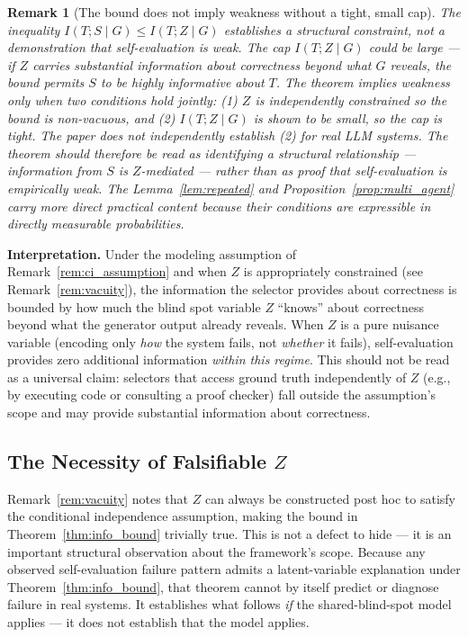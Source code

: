 \documentclass[11pt]{article}
\newtheorem{remark}[theorem]{Remark}
\begin{document}
\begin{remark}[The bound does not imply weakness without a tight, small cap]
\label{rem:cap_tightness}
The inequality $I(T; S \mid G) \leq I(T; Z \mid G)$ establishes a structural constraint,
not a demonstration that self-evaluation is weak. The cap $I(T; Z \mid G)$ could be large
--- if $Z$ carries substantial information about correctness beyond what $G$ reveals, the
bound permits $S$ to be highly informative about $T$. The theorem implies weakness only
when two conditions hold jointly: (1) $Z$ is independently constrained so the bound is
non-vacuous, and (2) $I(T; Z \mid G)$ is shown to be small, so the cap is tight. The
paper does not independently establish (2) for real LLM systems. The theorem should
therefore be read as identifying a structural relationship --- information from $S$ is
$Z$-mediated --- rather than as proof that self-evaluation is empirically weak. The
Lemma~\ref{lem:repeated} and Proposition~\ref{prop:multi_agent} carry more direct
practical content because their conditions are expressible in directly measurable
probabilities.
\end{remark}

\textbf{Interpretation.} Under the modeling assumption of Remark~\ref{rem:ci_assumption} and
when $Z$ is appropriately constrained (see Remark~\ref{rem:vacuity}), the information the
selector provides about correctness is bounded by how much the blind spot variable $Z$
``knows'' about correctness beyond what the generator output already reveals. When $Z$ is a
pure nuisance variable (encoding only \textit{how} the system fails, not \textit{whether} it
fails), self-evaluation provides zero additional information \emph{within this regime}. This
should not be read as a universal claim: selectors that access ground truth independently of
$Z$ (e.g., by executing code or consulting a proof checker) fall outside the assumption's
scope and may provide substantial information about correctness.

\subsection{The Necessity of Falsifiable $Z$}
\label{sec:falsifiable_z}

Remark~\ref{rem:vacuity} notes that $Z$ can always be constructed post hoc to satisfy the
conditional independence assumption, making the bound in Theorem~\ref{thm:info_bound}
trivially true. This is not a defect to hide --- it is an important structural observation
about the framework's scope. Because any observed self-evaluation failure pattern admits a
latent-variable explanation under Theorem~\ref{thm:info_bound}, that theorem cannot by
itself predict or diagnose failure in real systems. It establishes what follows \emph{if}
the shared-blind-spot model applies --- it does not establish that the model applies.
\end{document}
